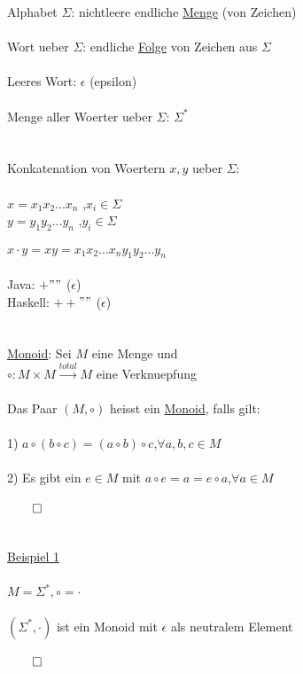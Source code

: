 \documentclass[18pt,a4paper]{scrreprt}
\newcommand{\tab}{\hspace*{2em}}
\begin{document}
Alphabet $\Sigma$: nichtleere endliche \uline{Menge} (von Zeichen)\\
\\
Wort ueber $\Sigma$: endliche \uline{Folge} von Zeichen aus $\Sigma$\\
\\
Leeres Wort: $\epsilon$ (epsilon)\\
\\
Menge aller Woerter ueber $\Sigma$: $\Sigma^*$\\
\\
\\
Konkatenation von Woertern $x,y$ ueber $\Sigma$:\\
\\
$x = x_1x_2 ... x_n$ \tab ,$x_i \in \Sigma$\\
$y = y_1y_2 ... y_n$\tab\:\: ,$y_i \in \Sigma$\\
\\
$x \cdot y = xy = x_1x_2 ... x_ny_1y_2 ... y_n$\\
\\
Java: $+$\tab\tab $""$ ($\epsilon$)\\
Haskell: $++$\tab $""$ ($\epsilon$)\\
\\
\\
\uline{Monoid}: Sei $M$ eine Menge und\\
\tab $\circ : M \times M \xrightarrow{total} M$ eine Verknuepfung\\
\\
Das Paar $(M, \circ)$ heisst ein \uline{Monoid}, falls gilt:\\
\\
1) $a \circ (b \circ c) = (a \circ b) \circ c$\tab ,$\forall a,b,c \in M$\\
\\
2) Es gibt ein $e \in M$ mit $a \circ e = a = e \circ a$\tab ,$\forall a \in M$\\
\\
$\qed$\\
\\
\\
\uline{Beispiel 1}\\
\\
$M = \Sigma^*, \circ = \cdot$\\
\\
$(\Sigma^*, \cdot)$ ist ein Monoid mit $\epsilon$ als neutralem Element\\
\\
$\qed$\\
\\
\end{document}
